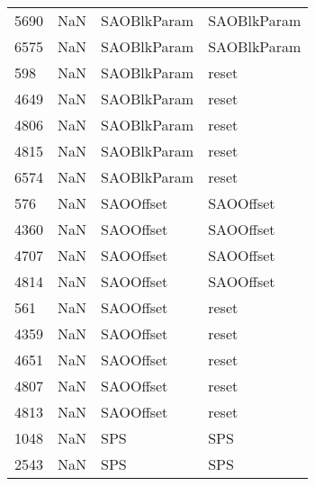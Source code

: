 \begin{tabular}{llll}
5690 &                   NaN &                SAOBlkParam &                               SAOBlkParam \\
6575 &                   NaN &                SAOBlkParam &                               SAOBlkParam \\
598  &                   NaN &                SAOBlkParam &                                     reset \\
4649 &                   NaN &                SAOBlkParam &                                     reset \\
4806 &                   NaN &                SAOBlkParam &                                     reset \\
4815 &                   NaN &                SAOBlkParam &                                     reset \\
6574 &                   NaN &                SAOBlkParam &                                     reset \\
576  &                   NaN &                  SAOOffset &                                 SAOOffset \\
4360 &                   NaN &                  SAOOffset &                                 SAOOffset \\
4707 &                   NaN &                  SAOOffset &                                 SAOOffset \\
4814 &                   NaN &                  SAOOffset &                                 SAOOffset \\
561  &                   NaN &                  SAOOffset &                                     reset \\
4359 &                   NaN &                  SAOOffset &                                     reset \\
4651 &                   NaN &                  SAOOffset &                                     reset \\
4807 &                   NaN &                  SAOOffset &                                     reset \\
4813 &                   NaN &                  SAOOffset &                                     reset \\
1048 &                   NaN &                        SPS &                                       SPS \\
2543 &                   NaN &                        SPS &                                       SPS \\

\end{tabular}
